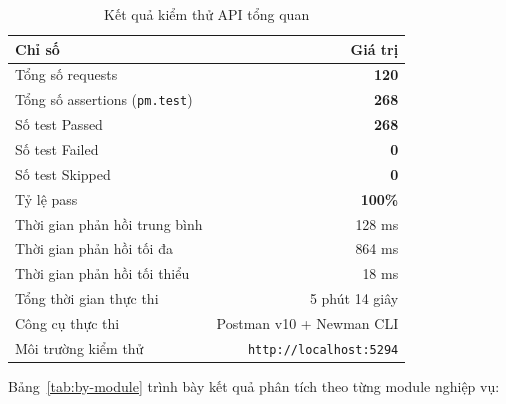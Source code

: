 \begin{table}[h!]
\centering
\caption{Kết quả kiểm thử API tổng quan}
\label{tab:overall}
\begin{tabular}{l r}
\toprule
Chỉ số & Giá trị \\
\midrule
Tổng số requests                        & \textbf{120} \\
Tổng số assertions (\texttt{pm.test})   & \textbf{268} \\
Số test Passed                          & \textbf{268} \\
Số test Failed                          & \textbf{0}   \\
Số test Skipped                         & \textbf{0}   \\
Tỷ lệ pass                              & \textbf{100\%} \\
Thời gian phản hồi trung bình           & 128 ms \\
Thời gian phản hồi tối đa               & 864 ms \\
Thời gian phản hồi tối thiểu            & 18 ms  \\
Tổng thời gian thực thi                 & 5 phút 14 giây \\
Công cụ thực thi                        & Postman v10 + Newman CLI \\
Môi trường kiểm thử                     & \texttt{http://localhost:5294} \\
\bottomrule
\end{tabular}
\end{table}

Bảng~\ref{tab:by-module} trình bày kết quả phân tích theo từng module nghiệp vụ:

